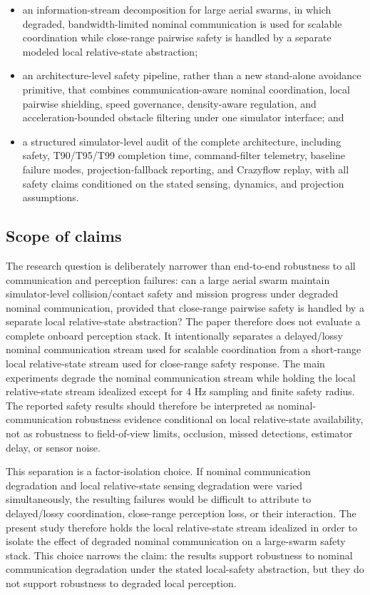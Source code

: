 \documentclass[11pt]{article}
\begin{document}
\begin{itemize}
    \item an information-stream decomposition for large aerial swarms, in which degraded, bandwidth-limited nominal communication is used for scalable coordination while close-range pairwise safety is handled by a separate modeled local relative-state abstraction;
    \item an architecture-level safety pipeline, rather than a new stand-alone avoidance primitive, that combines communication-aware nominal coordination, local pairwise shielding, speed governance, density-aware regulation, and acceleration-bounded obstacle filtering under one simulator interface; and
    \item a structured simulator-level audit of the complete architecture, including safety, T90/T95/T99 completion time, command-filter telemetry, baseline failure modes, projection-fallback reporting, and Crazyflow replay, with all safety claims conditioned on the stated sensing, dynamics, and projection assumptions.
\end{itemize}

\subsection{Scope of claims}

The research question is deliberately narrower than end-to-end robustness to all communication and perception failures: can a large aerial swarm maintain simulator-level collision/contact safety and mission progress under degraded nominal communication, provided that close-range pairwise safety is handled by a separate local relative-state abstraction? The paper therefore does not evaluate a complete onboard perception stack. It intentionally separates a delayed/lossy nominal communication stream used for scalable coordination from a short-range local relative-state stream used for close-range safety response. The main experiments degrade the nominal communication stream while holding the local relative-state stream idealized except for 4 Hz sampling and finite safety radius. The reported safety results should therefore be interpreted as nominal-communication robustness evidence conditional on local relative-state availability, not as robustness to field-of-view limits, occlusion, missed detections, estimator delay, or sensor noise.

This separation is a factor-isolation choice. If nominal communication degradation and local relative-state sensing degradation were varied simultaneously, the resulting failures would be difficult to attribute to delayed/lossy coordination, close-range perception loss, or their interaction. The present study therefore holds the local relative-state stream idealized in order to isolate the effect of degraded nominal communication on a large-swarm safety stack. This choice narrows the claim: the results support robustness to nominal communication degradation under the stated local-safety abstraction, but they do not support robustness to degraded local perception.
\end{document}
